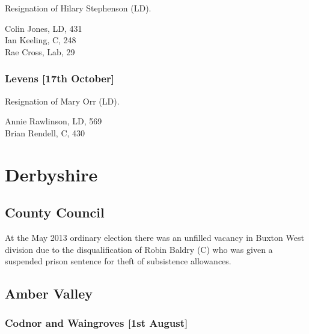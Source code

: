 \documentclass[a4paper,openany,10pt]{book}
\begin{document}

Resignation of Hilary Stephenson (LD).



Colin Jones, LD, 431\\
Ian Keeling, C, 248\\
Rae Cross, Lab, 29\\


\subsubsection*{Levens \hspace*{\fill}\nolinebreak[1]%
\enspace\hspace*{\fill}
[17th October]}


Resignation of Mary Orr (LD).



Annie Rawlinson, LD, 569\\
Brian Rendell, C, 430\\


\vfill

\section{Derbyshire}

\subsection*{County Council}

At the May 2013 ordinary election there was an unfilled vacancy in Buxton West division due to the disqualification of Robin Baldry (C) who was given a suspended prison sentence for theft of subsistence allowances.


\subsection*{Amber Valley}

\subsubsection*{Codnor and Waingroves \hspace*{\fill}\nolinebreak[1]%
\enspace\hspace*{\fill}
[1st August]}
\end{document}
